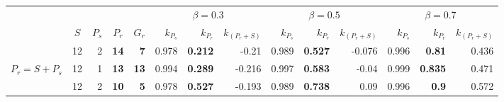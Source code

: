 \documentclass[journal]{IEEEtran}
\begin{document}
\begin{table}[]
\begin{tabular}{|l|rrrr|rrr|rrr|rrr|}
\hline
                              & \multicolumn{1}{c|}{}                      & \multicolumn{1}{c|}{}                        & \multicolumn{1}{c|}{}                        & \multicolumn{1}{c|}{}                        & \multicolumn{3}{c|}{$\beta=0.3$}                                  & \multicolumn{3}{c|}{$\beta=0.5$}                                  & \multicolumn{3}{c|}{$\beta=0.7$}                                  \\ \cline{6-14}
\multirow{-2}{*}{}            & \multicolumn{1}{c|}{\multirow{-2}{*}{$S$}} & \multicolumn{1}{c|}{\multirow{-2}{*}{$P_s$}} & \multicolumn{1}{c|}{\multirow{-2}{*}{$P_r$}} & \multicolumn{1}{c|}{\multirow{-2}{*}{$G_r$}} & $k_{P_s}$ & $k_{P_r}$                             & $k_{(P_r+S)}$ & $k_{P_s}$ & $k_{P_r}$                             & $k_{(P_r+S)}$ & $k_{P_s}$ & $k_{P_r}$                             & $k_{(P_r+S)}$ \\ \hline
                              & 12                                         & 2                                            & {\color[HTML]{FF0000} \textbf{14}}           & {\color[HTML]{FF0000} \textbf{7}}            & 0.978     & {\color[HTML]{FF0000} \textbf{0.212}} & -0.21         & 0.989     & {\color[HTML]{FF0000} \textbf{0.527}} & -0.076        & 0.996     & {\color[HTML]{FF0000} \textbf{0.81}}  & 0.436         \\
\multirow{-2}{*}{$P_r=S+P_s$} & 12                                         & 1                                            & {\color[HTML]{5B9BD5} \textbf{13}}           & {\color[HTML]{5B9BD5} \textbf{13}}           & 0.994     & {\color[HTML]{5B9BD5} \textbf{0.289}} & -0.216        & 0.997     & {\color[HTML]{5B9BD5} \textbf{0.583}} & -0.04         & 0.999     & {\color[HTML]{5B9BD5} \textbf{0.835}} & 0.471         \\ \hline
                              & 12                                         & 2                                            & {\color[HTML]{FF0000} \textbf{10}}           & {\color[HTML]{FF0000} \textbf{5}}            & 0.978     & {\color[HTML]{FF0000} \textbf{0.527}} & -0.193        & 0.989     & {\color[HTML]{FF0000} \textbf{0.738}} & 0.09          & 0.996     & {\color[HTML]{FF0000} \textbf{0.9}}   & 0.572         \\

\end{tabular}
\end{table}
\end{document}
